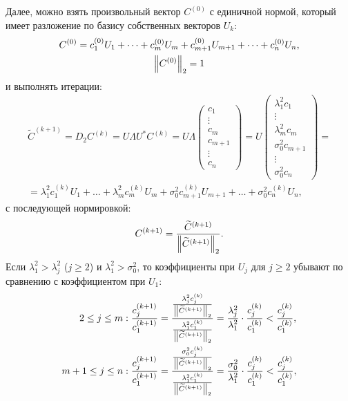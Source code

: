 Далее, можно взять произвольный вектор $C^{(0)}$ с единичной нормой, который имеет разложение по базису собственных векторов $U_k$:
\begin{gather*}
    C^{(0)} = c_1^{(0)} U_1 + \dots + c_m^{(0)} U_m + c_{m+1}^{(0)} U_{m+1} + \dots + c_n^{(0)} U_n, \\
    \left \| C^{(0)} \right \|_{2} = 1
\end{gather*}
и выполнять итерации:
\begin{multline*}
    \widetilde{C}^{(k+1)}
    = D_2 C^{(k)}
    = U \Lambda U^* C^{(k)}
    = U \Lambda
    \begin{pmatrix}
        c_1     \\
        \vdots  \\
        c_m     \\
        c_{m+1} \\
        \vdots  \\
        c_n
    \end{pmatrix}
    = U
    \begin{pmatrix}
        \lambda_1^2 c_1    \\
        \vdots             \\
        \lambda_m^2 c_m    \\
        \sigma_0^2 c_{m+1} \\
        \vdots             \\
        \sigma_0^2 c_n
    \end{pmatrix} = \\
    = \lambda_1^2 c_1^{(k)} U_1 + \dots + \lambda_m^2 c_m^{(k)} U_m + \sigma_0^2 c_{m+1}^{(k)} U_{m+1} + \dots + \sigma_0^2 c_n^{(k)} U_n ,
\end{multline*}
с последующей нормировкой:
\[
    C^{(k+1)} = \frac{\widetilde{C}^{(k+1)}}{\left \| \widetilde{C}^{(k+1)} \right \|_{2}}.
\]
Если $\lambda_1^2 > \lambda_j^2$ ($j \ge 2$) и $\lambda_1^2 > \sigma_0^2$, то коэффициенты при $U_j$ для $j \ge 2$ убывают по сравнению с коэффициентом при $U_1$:
\begin{align*}
    2 \le j \le m   & :
    \frac{c_j^{(k+1)}}{c_1^{(k+1)}}
    = \frac{\frac{\lambda_j^2 c_j^{(k)}}{\left \| \widetilde{C}^{(k+1)} \right \|_{2}}}{\frac{\lambda_1^2 c_1^{(k)}}{\left \| \widetilde{C}^{(k+1)} \right \|_{2}}}
    = \frac{\lambda_j^2}{\lambda_1^2} \cdot \frac{c_j^{(k)}}{c_1^{(k)}}
    < \frac{c_j^{(k)}}{c_1^{(k)}} , \\
    m+1 \le j \le n & :
    \frac{c_j^{(k+1)}}{c_1^{(k+1)}}
    = \frac{\frac{\sigma_0^2 c_j^{(k)}}{\left \| \widetilde{C}^{(k+1)} \right \|_{2}}}{\frac{\lambda_1^2 c_1^{(k)}}{\left \| \widetilde{C}^{(k+1)} \right \|_{2}}}
    = \frac{\sigma_0^2}{\lambda_1^2} \cdot \frac{c_j^{(k)}}{c_1^{(k)}}
    < \frac{c_j^{(k)}}{c_1^{(k)}} , \\
\end{align*}
